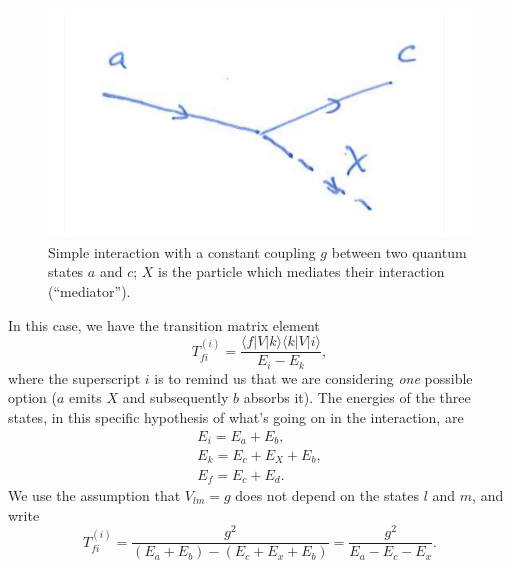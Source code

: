 \begin{figure}[h]
    \centering
    \includegraphics[scale=0.2]{Figures/qscat3.pdf}
    \caption{Simple interaction with a constant coupling $g$ between two quantum states $a$ and $c$; $X$ is the  particle which mediates their interaction (``mediator'').}
    \label{quantum-scattering:fig5}
\end{figure}

In this case, we have the transition matrix element
\begin{equation*}
    T_{fi}^{(i)} = \frac{\langle f | V | k\rangle\langle k | V | i \rangle}{E_{i}-E_{k}},
\end{equation*}
where the superscript $i$ is to remind us that we are considering \emph{one} possible option ($a$ emits $X$ and subsequently $b$ absorbs it).
The energies of the three states, in this specific hypothesis of what's going on in the interaction, are
\begin{align*}
        E_{i} = E_{a}+E_{b},\\
        E_{k} = E_{c}+E_{X}+E_{b},\\
         E_{f} = E_{c}+E_{d}.
\end{align*}
We use the assumption that $V_{lm}=g$ does not depend on the states $l$ and $m$, and write
\begin{equation*}
    T_{fi}^{(i)} = \frac{g^2}{(E_{a}+E_{b}) - (E_{c}+E_{x}+E_{b})} = \frac{g^2}{E_{a}-E_{c}-E_{x}}.
\end{equation*}

